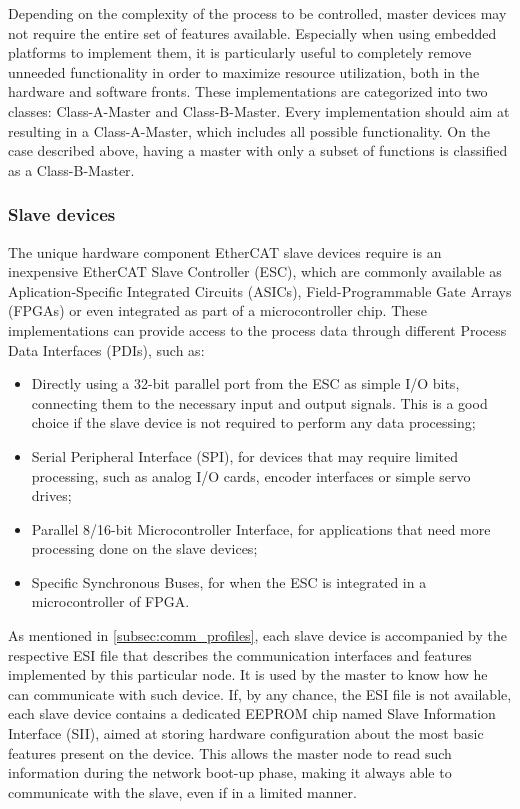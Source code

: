 Depending on the complexity of the process to be controlled, master devices may not require the entire set of features available.
Especially when using embedded platforms to implement them, it is particularly useful to completely remove unneeded functionality in order to maximize resource utilization, both in the hardware and software fronts.
These implementations are categorized into two classes: Class-A-Master and Class-B-Master.
Every implementation should aim at resulting in a Class-A-Master, which includes all possible functionality.
On the case described above, having a master with only a subset of functions is classified as a Class-B-Master.

\subsubsection{Slave devices} \label{subsubsec:slave_devices}

The unique hardware component EtherCAT slave devices require is an inexpensive EtherCAT Slave Controller (ESC), which are commonly available as Aplication-Specific Integrated Circuits (ASICs), Field-Programmable Gate Arrays (FPGAs) or even integrated as part of a microcontroller chip.
These implementations can provide access to the process data through different Process Data Interfaces (PDIs), such as:

\begin{itemize}
	\item Directly using a 32-bit parallel port from the ESC as simple I/O bits, connecting them to the necessary input and output signals. This is a good choice if the slave device is not required to perform any data processing;

	\item Serial Peripheral Interface (SPI), for devices that may require limited processing, such as analog I/O cards, encoder interfaces or simple servo drives;

	\item Parallel 8/16-bit Microcontroller Interface, for applications that need more processing done on the slave devices;

	\item Specific Synchronous Buses, for when the ESC is integrated in a microcontroller of FPGA.
\end{itemize}

As mentioned in \autoref{subsec:comm_profiles}, each slave device is accompanied by the respective ESI file that describes the communication interfaces and features implemented by this particular node.
It is used by the master to know how he can communicate with such device.
If, by any chance, the ESI file is not available, each slave device contains a dedicated EEPROM chip named Slave Information Interface (SII), aimed at storing hardware configuration about the most basic features present on the device.
This allows the master node to read such information during the network boot-up phase, making it always able to communicate with the slave, even if in a limited manner.
